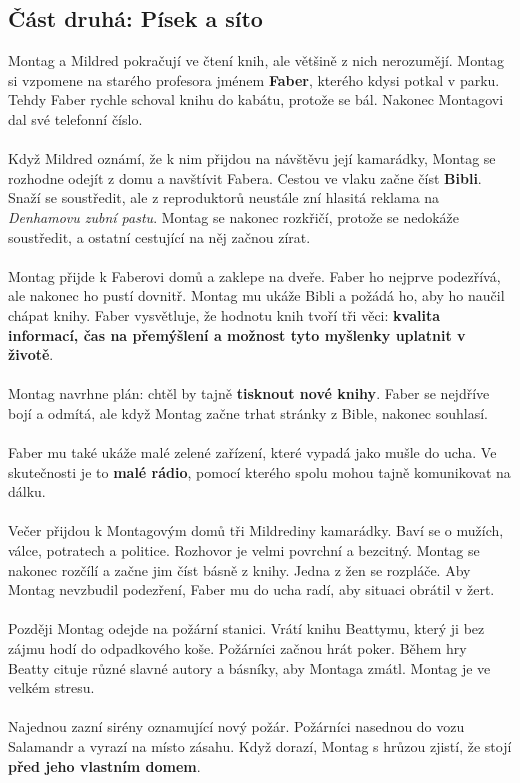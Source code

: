 \documentclass[12pt,a4paper]{article}
\begin{document}
\subsection*{Část druhá: Písek a síto}

Montag a Mildred pokračují ve čtení knih, ale většině z nich nerozumějí. Montag si vzpomene na starého profesora jménem \textbf{Faber}, kterého kdysi potkal v parku. Tehdy Faber rychle schoval knihu do kabátu, protože se bál. Nakonec Montagovi dal své telefonní číslo. \\
 \\
Když Mildred oznámí, že k nim přijdou na návštěvu její kamarádky, Montag se rozhodne odejít z domu a navštívit Fabera. Cestou ve vlaku začne číst \textbf{Bibli}. Snaží se soustředit, ale z reproduktorů neustále zní hlasitá reklama na \textit{Denhamovu zubní pastu}. Montag se nakonec rozkřičí, protože se nedokáže soustředit, a ostatní cestující na něj začnou zírat. \\
 \\
Montag přijde k Faberovi domů a zaklepe na dveře. Faber ho nejprve podezřívá, ale nakonec ho pustí dovnitř. Montag mu ukáže Bibli a požádá ho, aby ho naučil chápat knihy. Faber vysvětluje, že hodnotu knih tvoří tři věci: \textbf{kvalita informací, čas na přemýšlení a možnost tyto myšlenky uplatnit v životě}. \\
 \\
Montag navrhne plán: chtěl by tajně \textbf{tisknout nové knihy}. Faber se nejdříve bojí a odmítá, ale když Montag začne trhat stránky z Bible, nakonec souhlasí. \\
 \\
Faber mu také ukáže malé zelené zařízení, které vypadá jako mušle do ucha. Ve skutečnosti je to \textbf{malé rádio}, pomocí kterého spolu mohou tajně komunikovat na dálku. \\
 \\
Večer přijdou k Montagovým domů tři Mildrediny kamarádky. Baví se o mužích, válce, potratech a politice. Rozhovor je velmi povrchní a bezcitný. Montag se nakonec rozčílí a začne jim číst básně z knihy. Jedna z žen se rozpláče. Aby Montag nevzbudil podezření, Faber mu do ucha radí, aby situaci obrátil v žert. \\
 \\
Později Montag odejde na požární stanici. Vrátí knihu Beattymu, který ji bez zájmu hodí do odpadkového koše. Požárníci začnou hrát poker. Během hry Beatty cituje různé slavné autory a básníky, aby Montaga zmátl. Montag je ve velkém stresu. \\
 \\
Najednou zazní sirény oznamující nový požár. Požárníci nasednou do vozu Salamandr a vyrazí na místo zásahu. Když dorazí, Montag s hrůzou zjistí, že stojí \textbf{před jeho vlastním domem}.
\end{document}
